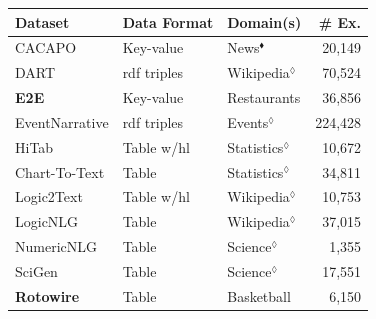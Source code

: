 {\begin{table}[t]
    \centering\small
    \begin{tabular}{@{}lllr@{}}
        \toprule
        \textbf{Dataset}                                                                           & \textbf{Data Format} & \textbf{Domain(s)}      & \textbf{\# Ex.} \\  \midrule
        CACAPO \cite{vanderleeCACAPODatasetMultilingual2020}                                       & Key-value            & News$^\blacklozenge$    & 20,149          \\
        DART \cite{nan2021dart}                                                                    & \ac{rdf} triples     & Wikipedia$^\lozenge$    & 70,524          \\
        \textbf{E2E} \cite{dusekSemanticNoiseMatters2019,dusekEvaluatingStateoftheartEndtoEnd2020} & Key-value            & Restaurants             & 36,856          \\
        EventNarrative \cite{colas2021eventnarrative}                                              & \ac{rdf} triples     & Events$^\lozenge$       & 224,428         \\
        HiTab \cite{chengHiTabHierarchicalTable2021}                                               & Table w/hl           & Statistics$^\lozenge$   & 10,672          \\
        Chart-To-Text \cite{kantharajCharttoTextLargeScaleBenchmark2022}                           & Table                & Statistics$^\lozenge$   & 34,811          \\
        Logic2Text \cite{chenLogic2TextHighFidelityNatural2020}                                    & Table w/hl           & Wikipedia$^\lozenge$    & 10,753          \\
        LogicNLG \cite{chenLogicalNaturalLanguage2020}                                             & Table                & Wikipedia$^\lozenge$    & 37,015          \\
        NumericNLG \cite{suadaaTabletoTextGenerationNumerical2021}                                 & Table                & Science$^\lozenge$      & 1,355           \\
        SciGen \cite{moosaviLearningReasonText2021}                                                & Table                & Science$^\lozenge$      & 17,551          \\
        \textbf{Rotowire} \cite{wiseman2017challenges}                                             & Table                & Basketball              & 6,150           \\

\end{tabular}
\end{table}}

